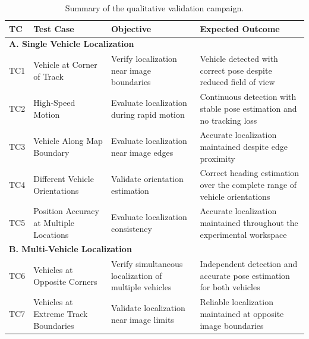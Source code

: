 \begin{table}[!ht]
	\centering
	\caption{Summary of the qualitative validation campaign.}
	\label{tab:validation_strategy}
	\renewcommand{\arraystretch}{1.25}
	\footnotesize
	
	\begin{tabular}{p{1.1cm} p{4.0cm} p{4.5cm} p{6.0cm}}
		\toprule
		\textbf{TC} &
		\textbf{Test Case} &
		\textbf{Objective} &
		\textbf{Expected Outcome} \\
		\midrule
		
		\multicolumn{4}{l}{\textbf{A. Single Vehicle Localization}}\\
		\midrule
		
		TC1 &
		Vehicle at Corner of Track &
		Verify localization near image boundaries &
		Vehicle detected with correct pose despite reduced field of view \\
		
		TC2 &
		High-Speed Motion &
		Evaluate localization during rapid motion &
		Continuous detection with stable pose estimation and no tracking loss \\
		
		TC3 &
		Vehicle Along Map Boundary &
		Evaluate localization near image edges &
		Accurate localization maintained despite edge proximity \\
		
		TC4 &
		Different Vehicle Orientations &
		Validate orientation estimation &
		Correct heading estimation over the complete range of vehicle orientations \\
		
		TC5 &
		Position Accuracy at Multiple Locations &
		Evaluate localization consistency &
		Accurate localization maintained throughout the experimental workspace \\
		
		\midrule
		
		\multicolumn{4}{l}{\textbf{B. Multi-Vehicle Localization}}\\
		\midrule
		
		TC6 &
		Vehicles at Opposite Corners &
		Verify simultaneous localization of multiple vehicles &
		Independent detection and accurate pose estimation for both vehicles \\
		
		TC7 &
		Vehicles at Extreme Track Boundaries &
		Validate localization near image limits &
		Reliable localization maintained at opposite image boundaries \\
		

\end{tabular}
\end{table}
